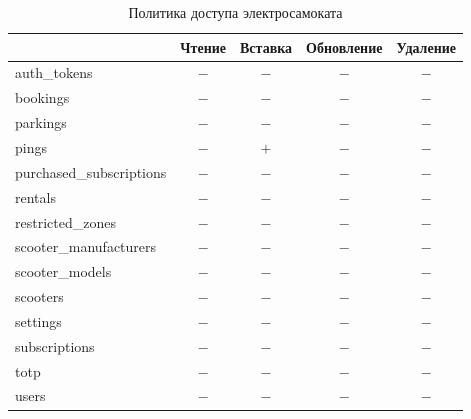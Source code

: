\begin{table}[H]
	\begin{threeparttable}[b]
		\caption{Политика доступа электросамоката}
		\label{tbl:scooter-policy}
		{\renewcommand{\arraystretch}{1.2}
			\begin{tabularx}{\textwidth}
				{
					| >{\raggedright\arraybackslash}X
					| >{\centering\arraybackslash}c
					| >{\centering\arraybackslash}c
					| >{\centering\arraybackslash}c
					| >{\centering\arraybackslash}c |
				}
				\hline
				                         & \textbf{Чтение} & \textbf{Вставка} & \textbf{Обновление} & \textbf{Удаление} \\
				\hline
				auth\_tokens             & $-$             & $-$              & $-$                 & $-$               \\
				\hline
				bookings                 & $-$             & $-$              & $-$                 & $-$               \\
				\hline
				parkings                 & $-$             & $-$              & $-$                 & $-$               \\
				\hline
				pings                    & $-$             & $+$              & $-$                 & $-$               \\
				\hline
				purchased\_subscriptions & $-$             & $-$              & $-$                 & $-$               \\
				\hline
				rentals                  & $-$             & $-$              & $-$                 & $-$               \\
				\hline
				restricted\_zones        & $-$             & $-$              & $-$                 & $-$               \\
				\hline
				scooter\_manufacturers   & $-$             & $-$              & $-$                 & $-$               \\
				\hline
				scooter\_models          & $-$             & $-$              & $-$                 & $-$               \\
				\hline
				scooters                 & $-$             & $-$              & $-$                 & $-$               \\
				\hline
				settings                 & $-$             & $-$              & $-$                 & $-$               \\
				\hline
				subscriptions            & $-$             & $-$              & $-$                 & $-$               \\
				\hline
				totp                     & $-$             & $-$              & $-$                 & $-$               \\
				\hline
				users                    & $-$             & $-$              & $-$                 & $-$               \\
				\hline
			\end{tabularx}}
	\end{threeparttable}
\end{table}


